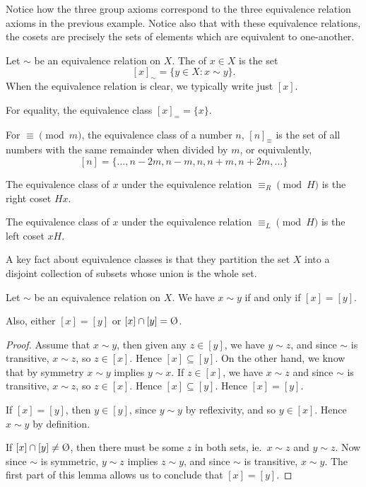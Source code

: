 Notice how the three group axioms correspond to the three equivalence relation
axioms in the previous example.  Notice also that with these equivalence
relations, the cosets are precisely the sets of elements which are equivalent
to one-another.

\begin{definition}
  Let $\sim$ be an equivalence relation on $X$.  The 
  of $x \in X$ is the set
  \[
    [x]_{\sim} = \{ y \in X : x \sim y \}.
  \]
  When the equivalence relation is clear, we typically write just $[x]$.
\end{definition}

\begin{example}
  For equality, the equivalence class $[x]_{=} = \{x\}$.
\end{example}

\begin{example}\label{eg:equivmodm}
  For $\equiv \pmod{m}$, the equivalence class of a number $n$,
  $[n]_{\equiv}$ is the set of all numbers with the same remainder when divided
  by $m$, or equivalently,
  \[
    [n] = \{\ldots, n-2m, n-m, n, n+m, n+2m, \ldots\}
  \]
\end{example}

\begin{example}
  The equivalence class of $x$ under the equivalence relation $\equiv_{R} \pmod{H}$
  is the right coset $Hx$.

  The equivalence class of $x$ under the equivalence relation $\equiv_{L} \pmod{H}$
  is the left coset $xH$.
\end{example}

A key fact about equivalence classes is that they partition the set $X$ into a
disjoint collection of subsets whose union is the whole set.

\begin{lemma}
  Let $\sim$ be an equivalence relation on $X$.  We have $x \sim y$ if and
  only if $[x] = [y]$.
  
  Also, either $[x] = [y]$ or $[x] \intersect [y] = \emptyset$.
\end{lemma}
\begin{proof}
  Assume that $x \sim y$, then given any $z \in [y]$, we have $y \sim z$,
  and since $\sim$ is transitive, $x \sim z$, so $z \in [x]$.  Hence $[x]
  \subseteq [y]$.  On the other hand, we know that by symmetry $x \sim y$
  implies $y \sim x$. If $z \in [x]$, we have $x \sim z$ and since $\sim$ is transitive, $x \sim z$, so $z \in [x]$.  Hence $[x]
  \subseteq [y]$.  Hence $[x] = [y]$.
  
  If $[x] = [y]$, then $y \in [y]$, since $y \sim y$ by reflexivity, and
  so $y \in [x]$.  Hence $x \sim y$ by definition.

  If $[x] \intersect [y] \ne \emptyset$, then there must be some $z$ in both
  sets, ie.~$x \sim z$ and $y \sim z$.  Now since $\sim$ is symmetric, $y \sim z$
  implies $z \sim y$, and since $\sim$ is transitive, $x \sim y$.  The first
  part of this lemma allows us to conclude that $[x] = [y]$.
\end{proof}


